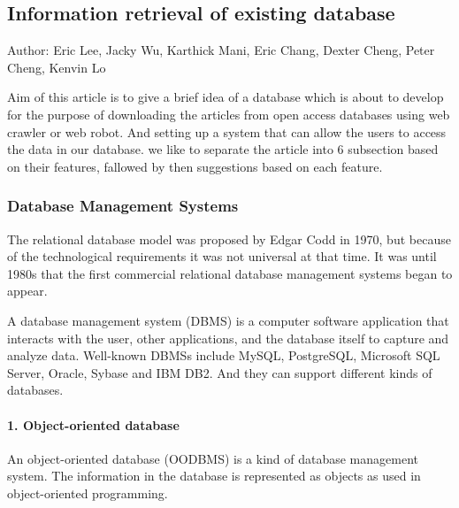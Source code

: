 	
\subsection{Information retrieval of existing database}
Author: Eric Lee, Jacky Wu, Karthick Mani, Eric Chang, Dexter Cheng, Peter Cheng, Kenvin Lo

Aim of this article is to give a brief idea of a database which is about to develop for the purpose of downloading the articles from open access databases using web crawler or web robot. And setting up a system that can allow the users to access the data in our database. we like to separate the article into 6 subsection based on their features, fallowed by then suggestions based on each feature. 


\subsubsection*{Database Management Systems}

The relational database model was proposed by Edgar Codd in 1970, but because of the technological requirements it was not universal at that time. It was until 1980s that the first commercial relational database management systems began to appear.

A database management system (DBMS) is a computer software application that interacts with the user, other applications, and the database itself to capture and analyze data. Well-known DBMSs include MySQL, PostgreSQL, Microsoft SQL Server, Oracle, Sybase and IBM DB2. And they can support different kinds of databases.


\paragraph{1. Object-oriented database}
An object-oriented database (OODBMS) is a kind of database management 	system.\cite{WiKiauthor2013} The information in the database is represented as objects as used in object-oriented programming.

